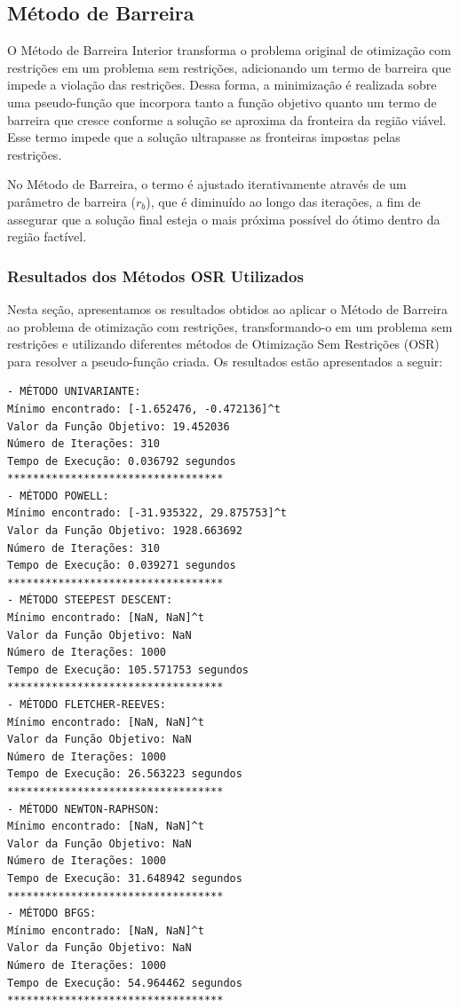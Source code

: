 \documentclass[a4paper, 12pt]{article}
\begin{document}
\newpage
\subsection{Método de Barreira}

O Método de Barreira Interior transforma o problema original de otimização com restrições em um problema sem restrições, adicionando um termo de barreira que impede a violação das restrições. Dessa forma, a minimização é realizada sobre uma pseudo-função que incorpora tanto a função objetivo quanto um termo de barreira que cresce conforme a solução se aproxima da fronteira da região viável. Esse termo impede que a solução ultrapasse as fronteiras impostas pelas restrições.

No Método de Barreira, o termo é ajustado iterativamente através de um parâmetro de barreira ($r_b$), que é diminuído ao longo das iterações, a fim de assegurar que a solução final esteja o mais próxima possível do ótimo dentro da região factível.

\subsubsection{Resultados dos Métodos OSR Utilizados}

Nesta seção, apresentamos os resultados obtidos ao aplicar o Método de Barreira ao problema de otimização com restrições, transformando-o em um problema sem restrições e utilizando diferentes métodos de Otimização Sem Restrições (OSR) para resolver a pseudo-função criada. Os resultados estão apresentados a seguir:

\begin{verbatim}
- MÉTODO UNIVARIANTE:
Mínimo encontrado: [-1.652476, -0.472136]^t
Valor da Função Objetivo: 19.452036
Número de Iterações: 310
Tempo de Execução: 0.036792 segundos
**********************************
- MÉTODO POWELL:
Mínimo encontrado: [-31.935322, 29.875753]^t
Valor da Função Objetivo: 1928.663692
Número de Iterações: 310
Tempo de Execução: 0.039271 segundos
**********************************
- MÉTODO STEEPEST DESCENT:
Mínimo encontrado: [NaN, NaN]^t
Valor da Função Objetivo: NaN
Número de Iterações: 1000
Tempo de Execução: 105.571753 segundos
**********************************
- MÉTODO FLETCHER-REEVES:
Mínimo encontrado: [NaN, NaN]^t
Valor da Função Objetivo: NaN
Número de Iterações: 1000
Tempo de Execução: 26.563223 segundos
**********************************
- MÉTODO NEWTON-RAPHSON:
Mínimo encontrado: [NaN, NaN]^t
Valor da Função Objetivo: NaN
Número de Iterações: 1000
Tempo de Execução: 31.648942 segundos
**********************************
- MÉTODO BFGS:
Mínimo encontrado: [NaN, NaN]^t
Valor da Função Objetivo: NaN
Número de Iterações: 1000
Tempo de Execução: 54.964462 segundos
**********************************
\end{verbatim}
\end{document}
